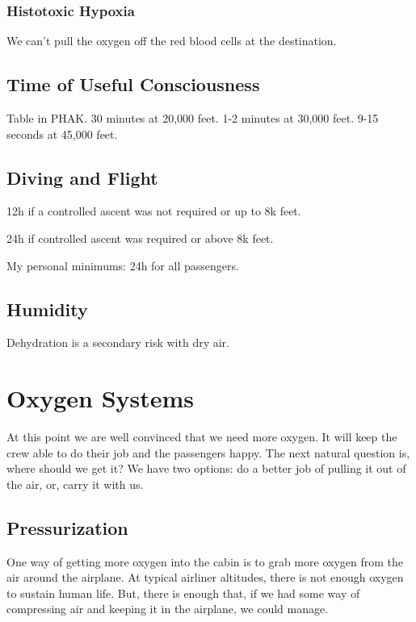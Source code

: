 \subsubsection{Histotoxic Hypoxia}

We can't pull the oxygen off the red blood cells at the destination.

\subsection{Time of Useful Consciousness}

Table in PHAK. 30 minutes at 20,000 feet. 1-2 minutes at 30,000 feet. 9-15 seconds at 45,000 feet.

\subsection{Diving and Flight}

12h if a controlled ascent was not required or up to 8k feet.

24h if controlled ascent was required or above 8k feet.

My personal minimums: 24h for all passengers.

\subsection{Humidity}

Dehydration is a secondary risk with dry air.

\section{Oxygen Systems}

At this point we are well convinced that we need more oxygen. It will keep the crew able to do their job and the passengers happy. The next natural question is, where should we get it? We have two options: do a better job of pulling it out of the air, or, carry it with us.

\subsection{Pressurization}

One way of getting more oxygen into the cabin is to grab more oxygen from the air around the airplane. At typical airliner altitudes, there is not enough oxygen to sustain human life. But, there is enough that, if we had some way of compressing air and keeping it in the airplane, we could manage.

